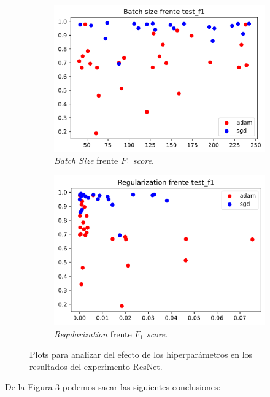 \begin{figure}[H]
\begin{subfigure}[b]{.5\textwidth}
  \centering
  \includegraphics[width=.8\linewidth]{imagenes/06_Experimentacion/resnet/resnetbs.png}
  \caption{\textit{Batch Size} frente \textit{$F_1$ score}.}
  \label{fig:resnetbs}
\end{subfigure}
\begin{subfigure}[b]{.5\textwidth}
  \centering
  \includegraphics[width=.8\linewidth]{imagenes/06_Experimentacion/resnet/resnetreg.png}
  \caption{\textit{Regularization} frente \textit{$F_1$ score}.}
  \label{fig:resnetreg}
\end{subfigure}

\caption{Plots para analizar del efecto de los hiperparámetros en los resultados del experimento ResNet.}
\label{fig:resnetanalysis}
\end{figure}

De la Figura \ref{fig:resnetanalysis} podemos sacar las siguientes conclusiones:

